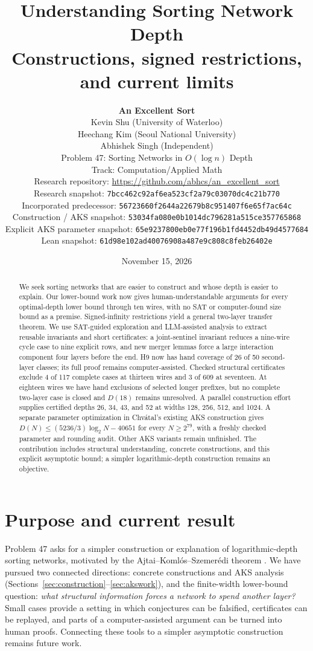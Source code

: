 \documentclass[11pt]{article}
\title{Understanding Sorting Network Depth\\\large Constructions, signed restrictions, and current limits}
\author{\textbf{An Excellent Sort}\\[3pt]
Kevin Shu (University of Waterloo)\\
Heechang Kim (Seoul National University)\\
Abhishek Singh (Independent)\\[7pt]
\small Problem 47: Sorting Networks in $O(\log n)$ Depth\\
\small Track: Computation/Applied Math\\[4pt]
\small Research repository: \url{https://github.com/abhcs/an_excellent_sort}\\
\small Research snapshot: \texttt{7bcc462c92af6ea523cf2a79c03070dc4c21b770}\\
\small Incorporated predecessor: \texttt{56723660f2644a22679b8c951407f6e65f7ac64c}\\
\small Construction / AKS snapshot: \texttt{53034fa080e0b1014dc796281a515ce357765868}\\
\small Explicit AKS parameter snapshot: \texttt{65e9237800eb0e77f196b1fd4452db49d4577684}\\
\small Lean snapshot: \texttt{61d98e102ad40076908a487e9c808c8feb26402e}}
\date{November 15, 2026}
\begin{document}
\maketitle
\begin{abstract}
We seek sorting networks that are easier to construct and whose depth is easier to explain. Our lower-bound work now gives human-understandable arguments for every optimal-depth lower bound through ten wires, with no SAT or computer-found size bound as a premise. Signed-infinity restrictions yield a general two-layer transfer theorem. We use SAT-guided exploration and LLM-assisted analysis to extract reusable invariants and short certificates: a joint-sentinel invariant reduces a nine-wire cycle case to nine explicit rows, and new merger lemmas force a large interaction component four layers before the end. H9 now has hand coverage of 26 of 50 second-layer classes; its full proof remains computer-assisted. Checked structural certificates exclude 4 of 117 complete cases at thirteen wires and 3 of 609 at seventeen. At eighteen wires we have hand exclusions of selected longer prefixes, but no complete two-layer case is closed and $D(18)$ remains unresolved. A parallel construction effort supplies certified depths 26, 34, 43, and 52 at widths 128, 256, 512, and 1024. A separate parameter optimization in Chv\'atal's existing AKS construction gives $D(N)\le(5236/3)\log_2N-40651$ for every $N\ge2^{79}$, with a freshly checked parameter and rounding audit. Other AKS variants remain unfinished. The contribution includes structural understanding, concrete constructions, and this explicit asymptotic bound; a simpler logarithmic-depth construction remains an objective.
\end{abstract}

\section{Purpose and current result}
Problem 47 asks for a simpler construction or explanation of logarithmic-depth sorting networks, motivated by the Ajtai--Koml\'os--Szemer\'edi theorem \cite{aks,problem}. We have pursued two connected directions: concrete constructions and AKS analysis (Sections~\ref{sec:construction}--\ref{sec:akswork}), and the finite-width lower-bound question: \emph{what structural information forces a network to spend another layer?} Small cases provide a setting in which conjectures can be falsified, certificates can be replayed, and parts of a computer-assisted argument can be turned into human proofs. Connecting these tools to a simpler asymptotic construction remains future work.
\end{document}
